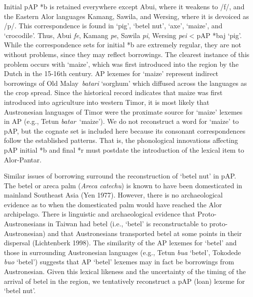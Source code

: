 Initial pAP *b is retained everywhere except Abui, where it weakens to /f/, and the Eastern Alor languages Kamang, Sawila, and Wersing, where it is devoiced as /p/. This correspondence is found in {\textquoteleft}pig{\textquoteright}, {\textquoteleft}betel nut{\textquoteright}, {\textquoteleft}axe{\textquoteright}, {\textquoteleft}maize{\textquoteright}, and {\textquoteleft}crocodile{\textquoteright}. Thus, Abui \textit{fe}, Kamang \textit{pe}, Sawila \textit{pi}, Wersing \textit{pei} {\textless} pAP *baj {\textquoteleft}pig{\textquoteright}. While the correspondence sets for initial *b are extremely regular, they are not without problems, since they may reflect borrowings. The clearest instance of this problem occurs with {\textquoteleft}maize{\textquoteright}, which was first introduced into the region by the Dutch in the 15-16th century. AP lexemes for {\textquoteleft}maize{\textquoteright} represent indirect borrowings of Old Malay~\textit{batari }{\textquoteleft}sorghum{\textquoteright} which diffused 
across the languages as the crop spread. Since the historical record indicates that maize was first introduced into agriculture into western Timor, it is most likely that Austronesian languages of Timor were the proximate source for {\textquoteleft}maize{\textquoteright} lexemes in AP (e.g., Tetun \textit{batar}~{\textquoteleft}maize{\textquoteright}). We do not reconstruct a word for {\textquoteleft}maize{\textquoteright} to pAP, but the cognate set is included here because its consonant correspondences follow the established patterns. That is, the phonological innovations affecting pAP initial *b and final *r must postdate the introduction of the lexical item to Alor-Pantar. 

Similar issues of borrowing surround the reconstruction of {\textquoteleft}betel nut{\textquoteright} in pAP. The betel or areca palm (\textit{Areca catechu}) is known to have been domesticated in mainland Southeast Asia (Yen 1977). However, there is no archaeological evidence as to when the domesticated palm would have reached the Alor archipelago. There is linguistic and archaeological evidence that Proto-Austronesians in Taiwan had betel (i.e., {\textquoteleft}betel{\textquoteright} is reconstructable to proto-Austronesian) and that Austronesians transported betel at some points in their dispersal (Lichtenberk 1998). The similarity of the AP lexemes for {\textquoteleft}betel{\textquoteright} and those in surrounding Austronesian languages (e.g., Tetun \textit{bua} {\textquoteleft}betel{\textquoteright}, Tokodede \textit{buo} {\textquoteleft}betel{\textquoteright}) suggests that AP {\textquoteleft}betel{\textquoteright} lexemes may in fact be borrowings from Austronesian. Given this lexical likeness and 
the uncertainty of the timing of the arrival of betel in the region, we tentatively reconstruct a pAP (loan) lexeme for {\textquoteleft}betel nut{\textquoteright}. 

